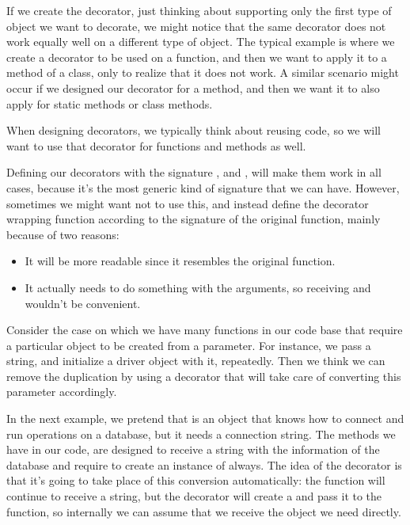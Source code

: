 \documentclass[a4paper,10pt,english]{sphinxmanual}
\begin{document}
If we create the decorator, just thinking about supporting only the first type of object we
want to decorate, we might notice that the same decorator does not work equally well on a
different type of object. The typical example is where we create a decorator to be used on a
function, and then we want to apply it to a method of a class, only to realize that it does not
work. A similar scenario might occur if we designed our decorator for a method, and then
we want it to also apply for static methods or class methods.

When designing decorators, we typically think about reusing code, so we will want to use
that decorator for functions and methods as well.

Defining our decorators with the signature , and , will make them work in
all cases, because it’s the most generic kind of signature that we can have. However,
sometimes we might want not to use this, and instead define the decorator wrapping
function according to the signature of the original function, mainly because of two reasons:
\begin{itemize}
\item {} 
It will be more readable since it resembles the original function.

\item {} 
It actually needs to do something with the arguments, so receiving  and  wouldn’t be convenient.

\end{itemize}

Consider the case on which we have many functions in our code base that require a
particular object to be created from a parameter. For instance, we pass a string, and
initialize a driver object with it, repeatedly. Then we think we can remove the duplication
by using a decorator that will take care of converting this parameter accordingly.

In the next example, we pretend that  is an object that knows how to connect and
run operations on a database, but it needs a connection string. The methods we have in our
code, are designed to receive a string with the information of the database and require to
create an instance of  always. The idea of the decorator is that it’s going to take
place of this conversion automatically: the function will continue to receive a string, but
the decorator will create a  and pass it to the function, so internally we can
assume that we receive the object we need directly.
\end{document}
